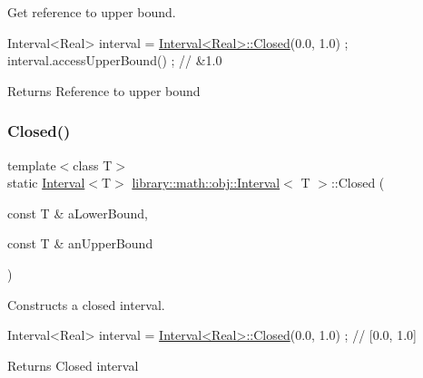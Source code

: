Get reference to upper bound. 


\begin{DoxyCode}
Interval<Real> interval = \hyperlink{classlibrary_1_1math_1_1obj_1_1_interval_aae8bb2b89af450729338d48563def4d7}{Interval<Real>::Closed}(0.0, 1.0) ;
interval.accessUpperBound() ; \textcolor{comment}{// &1.0}
\end{DoxyCode}


\begin{DoxyReturn}{Returns}
Reference to upper bound 
\end{DoxyReturn}
\mbox{\label{classlibrary_1_1math_1_1obj_1_1_interval_aae8bb2b89af450729338d48563def4d7}} 
\subsubsection{\texorpdfstring{Closed()}{Closed()}}
{\footnotesize\ttfamily template$<$class T$>$ \\
static \hyperlink{classlibrary_1_1math_1_1obj_1_1_interval}{Interval}$<$T$>$ \hyperlink{classlibrary_1_1math_1_1obj_1_1_interval}{library\+::math\+::obj\+::\+Interval}$<$ T $>$\+::Closed (\begin{DoxyParamCaption}\item[{const T \&}]{a\+Lower\+Bound,  }\item[{const T \&}]{an\+Upper\+Bound }\end{DoxyParamCaption})\hspace{0.3cm}{\ttfamily [static]}}



Constructs a closed interval. 


\begin{DoxyCode}
Interval<Real> interval = \hyperlink{classlibrary_1_1math_1_1obj_1_1_interval_aae8bb2b89af450729338d48563def4d7}{Interval<Real>::Closed}(0.0, 1.0) ; \textcolor{comment}{// [0.0, 1.0]}
\end{DoxyCode}


\begin{DoxyReturn}{Returns}
Closed interval 
\end{DoxyReturn}
\mbox{\label{classlibrary_1_1math_1_1obj_1_1_interval_af100f4b53dc3211efde2733c19e458c3}} 
